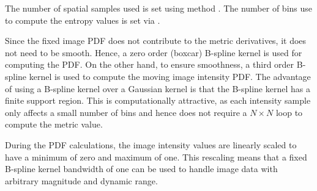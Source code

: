 The number of spatial samples used is set using method 
. The number of bins use to compute
the entropy values is set via .

Since the fixed image PDF does not contribute to the metric derivatives, it
does not need to be smooth. Hence, a zero order (boxcar) B-spline kernel is
used for computing the PDF. On the other hand, to ensure smoothness, a third
order B-spline kernel is used to compute the moving image intensity PDF. The
advantage of using a B-spline kernel over a Gaussian kernel is that the
B-spline kernel has a finite support region. This is computationally
attractive, as each intensity sample only affects a small number of bins and
hence does not require a $N \times N$ loop to compute the metric value.

During the PDF calculations, the image intensity values are linearly scaled
to have a minimum of zero and maximum of one. This rescaling means that a
fixed B-spline kernel bandwidth of one can be used to handle image data with
arbitrary magnitude and dynamic range.
